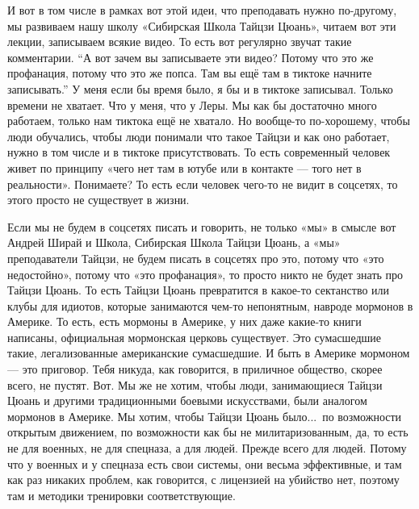 И вот в том числе в рамках вот этой идеи, 
что преподавать нужно по-другому, мы развиваем нашу 
школу «Сибирская Школа Тайцзи Цюань», читаем вот эти 
лекции, записываем всякие видео. То есть вот регулярно 
звучат такие комментарии. ``А вот зачем вы записываете 
эти видео? Потому что это же профанация, потому что это 
же попса. Там вы ещё там в тиктоке начните записывать.''
У меня если бы время было, я бы и в тиктоке записывал. 
Только времени не хватает. Что у меня, что у Леры.
Мы как бы достаточно много работаем, только нам 
тиктока ещё не хватало. Но вообще-то по-хорошему, чтобы люди 
обучались, чтобы люди понимали что такое Тайцзи и как 
оно работает, нужно в том числе и в тиктоке 
присутствовать. То есть современный человек живет по 
принципу «чего нет там в ютубе или в контакте --- того нет 
в реальности». Понимаете? То есть если человек чего-то 
не видит в соцсетях,  то этого просто не существует в 
жизни.

Если мы не будем в соцсетях писать и говорить, 
не только «мы» в смысле вот Андрей Ширай и Школа, 
Сибирская Школа Тайцзи Цюань, а «мы» преподаватели 
Тайцзи, не будем писать в соцсетях про это, потому что 
«это недостойно», потому что «это профанация», то просто 
никто не будет знать про Тайцзи Цюань. То есть Тайцзи 
Цюань превратится в какое-то сектанство или клубы для 
идиотов, которые занимаются чем-то непонятным, навроде 
мормонов в Америке.  То есть, есть мормоны в Америке, у 
них даже какие-то книги написаны,  официальная 
мормонская церковь существует.  Это сумасшедшие 
такие, легализованные американские сумасшедшие.  И 
быть в Америке мормоном --- это приговор. Тебя никуда, 
как говорится, в приличное общество, скорее всего, не 
пустят.  Вот. Мы же не хотим, чтобы люди, занимающиеся 
Тайцзи Цюань и другими традиционными боевыми 
искусствами, были аналогом мормонов в Америке. Мы 
хотим, чтобы Тайцзи Цюань было...\ по возможности 
открытым движением, по возможности как бы не 
милитаризованным,  да, то есть не для военных, не для 
спецназа, а для людей. Прежде всего для людей. Потому 
что у военных и у спецназа есть свои системы, они 
весьма эффективные,  и там как раз никаких проблем, как 
говорится, с лицензией на убийство нет, поэтому там и 
методики тренировки соответствующие.

